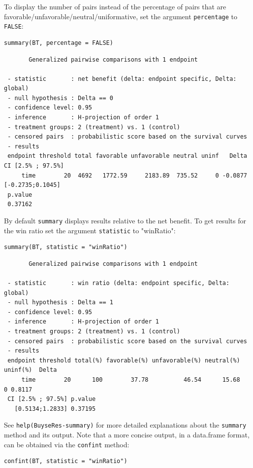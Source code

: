 \documentclass[12pt]{article}
\begin{document}
 To display the number of pairs instead of the percentage of pairs
that are favorable/unfavorable/neutral/uniformative, set the argument
\texttt{percentage} to \texttt{FALSE}:
\lstset{language=r,label= ,caption= ,captionpos=b,numbers=none}
\begin{lstlisting}
summary(BT, percentage = FALSE)
\end{lstlisting}

\begin{verbatim}
       Generalized pairwise comparisons with 1 endpoint

 - statistic       : net benefit (delta: endpoint specific, Delta: global) 
 - null hypothesis : Delta == 0 
 - confidence level: 0.95 
 - inference       : H-projection of order 1
 - treatment groups: 2 (treatment) vs. 1 (control) 
 - censored pairs  : probabilistic score based on the survival curves
 - results
 endpoint threshold total favorable unfavorable neutral uninf   Delta CI [2.5% ; 97.5%]
     time        20  4692   1772.59     2183.89  735.52     0 -0.0877  [-0.2735;0.1045]
 p.value 
 0.37162
\end{verbatim}

\bigskip

By default \texttt{summary} displays results relative to the net benefit. To
get results for the win ratio set the argument \texttt{statistic} to
"winRatio":
\lstset{language=r,label= ,caption= ,captionpos=b,numbers=none}
\begin{lstlisting}
summary(BT, statistic = "winRatio")
\end{lstlisting}

\begin{verbatim}
       Generalized pairwise comparisons with 1 endpoint

 - statistic       : win ratio (delta: endpoint specific, Delta: global) 
 - null hypothesis : Delta == 1 
 - confidence level: 0.95 
 - inference       : H-projection of order 1
 - treatment groups: 2 (treatment) vs. 1 (control) 
 - censored pairs  : probabilistic score based on the survival curves
 - results
 endpoint threshold total(%) favorable(%) unfavorable(%) neutral(%) uninf(%)  Delta
     time        20      100        37.78          46.54      15.68        0 0.8117
 CI [2.5% ; 97.5%] p.value 
   [0.5134;1.2833] 0.37195
\end{verbatim}

See \texttt{help(BuyseRes-summary)} for more detailed explanations about the
\texttt{summary} method and its output. Note that a more concise output, in a
data.frame format, can be obtained via the \texttt{confint} method:
\lstset{language=r,label= ,caption= ,captionpos=b,numbers=none}
\begin{lstlisting}
confint(BT, statistic = "winRatio")
\end{lstlisting}
\end{document}
